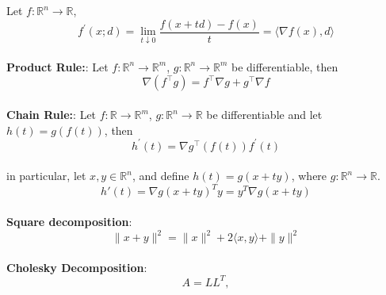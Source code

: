 {\begin{theorem}[]{}
    Let $f: \mathbb{R}^n \rightarrow \mathbb{R}$,
    \vspace{-4pt}\\
    \begin{equation*}
        f^\prime(x; d) = \lim_{t \downarrow 0} \frac{f(x + td) - f(x)}{t} = \langle \nabla f(x), d \rangle
    \end{equation*}
    \vspace{-4pt}\\
    \textbf{Product Rule:}:
    Let $f: \mathbb{R}^n \rightarrow \mathbb{R}^m$, $g: \mathbb{R}^n \rightarrow \mathbb{R}^m$ be differentiable, then
    \vspace{-4pt}\\
    \begin{equation*}
        \nabla (f^\top g) = f^\top \nabla g + g^\top \nabla f
    \end{equation*}
    \vspace{-4pt}\\
    \textbf{Chain Rule:}:
    Let $f: \mathbb{R} \rightarrow \mathbb{R}^m$, $g: \mathbb{R}^n \rightarrow \mathbb{R}$ be differentiable and let $h(t) = g(f(t))$, then
    \vspace{-4pt}\\
    \begin{equation*}
        h^\prime(t)=\nabla g^\top\left(f(t)\right) f^\prime(t)
    \end{equation*}
    \vspace{-4pt}\\
    in particular, let $x,y\in\mathbb{R}^n$, and define $h(t)=g(x+ty)$, where $g:\mathbb{R}^n\to\mathbb{R}$.
    \vspace{-4pt}\\
    $$
    h'(t)=\nabla g(x+ty)^T y = y^T\nabla g(x+ty)
    $$
    \vspace{-5pt}\\
    \textbf{Square decomposition}:
    \vspace{-5pt}\\
    \begin{equation*}
        \|x+y\|^2 = \|x\|^2 + 2\langle x, y \rangle + \|y\|^2
    \end{equation*}
    \vspace{-5pt}\\
    \textbf{Cholesky Decomposition}:
    \vspace{-5pt}\\
    \begin{equation*}
        A = LL^T, 
    \end{equation*}

\end{theorem}}
